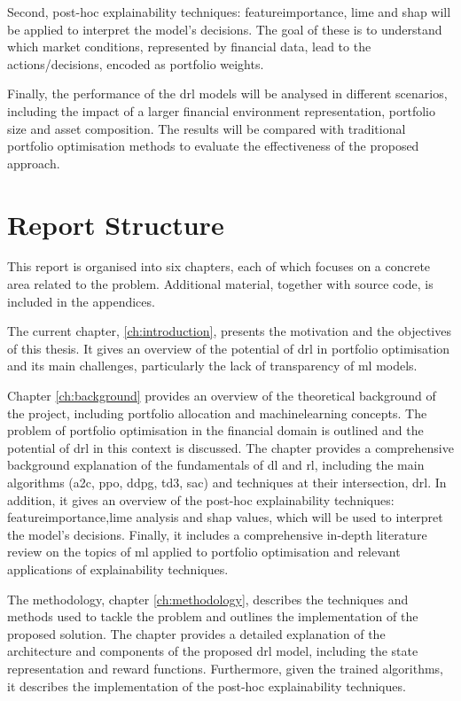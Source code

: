 Second, post-hoc explainability techniques: \Gls{featureimportance}, \acrfull{lime} and \acrfull{shap} will be applied to interpret the model's decisions. The goal of these is to understand which market conditions, represented by financial data, lead to the actions/decisions, encoded as portfolio weights. 

Finally, the performance of the \acrshort{drl} models will be analysed in different scenarios, including the impact of a larger financial environment representation, portfolio size and asset composition. The results will be compared with traditional portfolio optimisation methods to evaluate the effectiveness of the proposed approach.

\section{Report Structure} \label{sec:introduction-structure}

This report is organised into six chapters, each of which focuses on a concrete area related to the problem. Additional material, together with source code, is included in the appendices. 

The current chapter, \ref{ch:introduction}, presents the motivation and the objectives of this thesis. It gives an overview of the potential of \acrshort{drl} in portfolio optimisation and its main challenges, particularly the lack of transparency of \acrshort{ml} models. 

Chapter \ref{ch:background} provides an overview of the theoretical background of the project, including portfolio allocation and \acrlong{machinelearning} concepts. The problem of portfolio optimisation in the financial domain is outlined and the potential of \acrshort{drl} in this context is discussed. The chapter provides a comprehensive background explanation of the fundamentals of \acrlong{dl} and \acrlong{rl}, including the main algorithms (\acrshort{a2c}, \acrshort{ppo}, \acrshort{ddpg}, \acrshort{td3}, \acrshort{sac}) and techniques at their intersection, \acrshort{drl}. In addition, it gives an overview of the post-hoc explainability techniques: \Gls{featureimportance},\acrfull{lime} analysis and \acrfull{shap} values, which will be used to interpret the model's decisions. Finally, it includes a comprehensive in-depth literature review on the topics of \acrshort{ml} applied to portfolio optimisation and relevant applications of explainability techniques. 

The methodology, chapter \ref{ch:methodology}, describes the techniques and methods used to tackle the problem and outlines the implementation of the proposed solution. The chapter provides a detailed explanation of the architecture and components of the proposed \acrshort{drl} model, including the state representation and reward functions. Furthermore, given the trained algorithms, it describes the implementation of the post-hoc explainability techniques.

